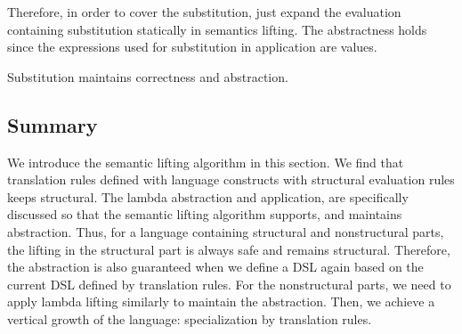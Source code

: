 Therefore, in order to cover the substitution,
 just expand the evaluation containing substitution statically in semantics lifting.
The abstractness holds since the expressions used for substitution in application are values.

\begin{theorem}
  Substitution maintains correctness and abstraction.
\end{theorem}

\subsection*{Summary}

We introduce the semantic lifting algorithm in this section.
We find that translation rules defined with language constructs with structural evaluation rules keeps structural.
The lambda abstraction and application, are specifically discussed so that the semantic lifting algorithm supports, and maintains abstraction.
Thus, for a language containing structural and nonstructural parts,
 the lifting in the structural part is always safe and remains structural.
Therefore, the abstraction is also guaranteed when we define a DSL again based on the current DSL defined by translation rules.
For the nonstructural parts, we need to apply lambda lifting similarly to maintain the abstraction.
Then, we achieve a vertical growth of the language: specialization by translation rules.
